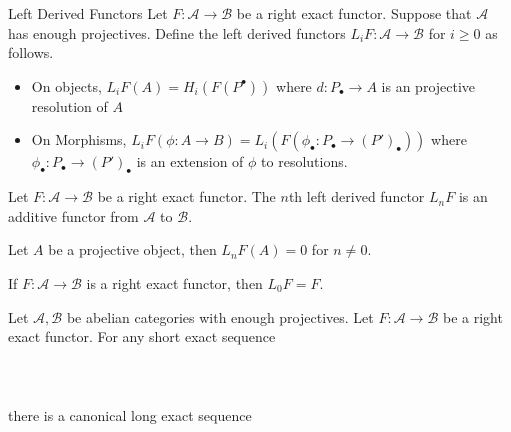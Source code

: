 \documentclass[a4paper]{article}
\begin{document}
\begin{defn}{Left Derived Functors}{} Let $F:\mathcal{A}\to\mathcal{B}$ be a right exact functor. Suppose that $\mathcal{A}$ has enough projectives. Define the left derived functors $L_iF:\mathcal{A}\to\mathcal{B}$ for $i\geq 0$ as follows. 
\begin{itemize}
\item On objects, $L_iF(A)=H_i(F(P^\bullet))$ where $d:P_\bullet\to A$ is an projective resolution of $A$
\item On Morphisms, $L_iF(\phi:A\to B)=L_i(F(\phi_\bullet:P_\bullet\to (P')_\bullet))$ where $\phi_\bullet:P_\bullet\to(P')_\bullet$ is an extension of $\phi$ to resolutions. 
\end{itemize}
\end{defn}

\begin{thm}{}{} Let $F:\mathcal{A}\to\mathcal{B}$ be a right exact functor. The $n$th left derived functor $L_nF$ is an additive functor from $\mathcal{A}$ to $\mathcal{B}$. 
\end{thm}

\begin{lmm}{}{} Let $A$ be a projective object, then $L_nF(A)=0$ for $n\neq 0$. 
\end{lmm}

\begin{crl}{}{} If $F:\mathcal{A}\to\mathcal{B}$ is a right exact functor, then $L_0F=F$. 
\end{crl}

\begin{thm}{}{} Let $\mathcal{A},\mathcal{B}$ be abelian categories with enough projectives. Let $F:\mathcal{A}\to\mathcal{B}$ be a right exact functor. For any short exact sequence \\~\\
\\~\\
there is a canonical long exact sequence \\~\\
\\~\\
\end{thm}
\end{document}
